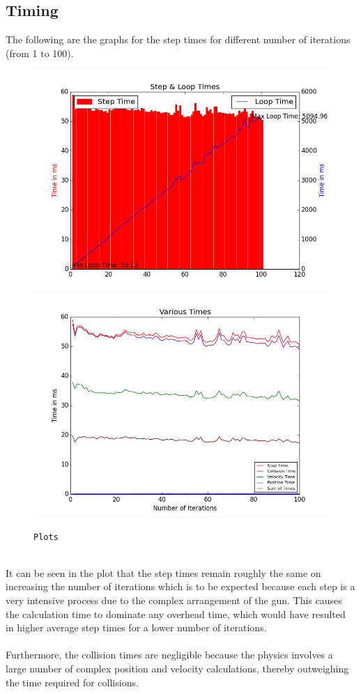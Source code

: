 \documentclass{article}
\begin{document}
\subsection{Timing}
The following are the graphs for the step times for different number of iterations (from 1 to 100).
\\
\begin{figure}[hbtp]
\includegraphics[scale=0.3]{plot1.png}
\includegraphics[scale=0.3]{plot2.png}
\caption{\texttt{Plots}}
\end{figure}
\\
It can be seen in the plot that the step times remain roughly the same on increasing the number of iterations which is to be expected because each step is a very intensive process due to the complex arrangement of the gun. This causes the calculation time to dominate any overhead time, which would have resulted in higher average step times for a lower number of iterations.
\\
\\
Furthermore, the collision times are negligible because the physics involves a large number of complex position and velocity calculations, thereby outweighing the time required for collisions.
\pagebreak
\end{document}

